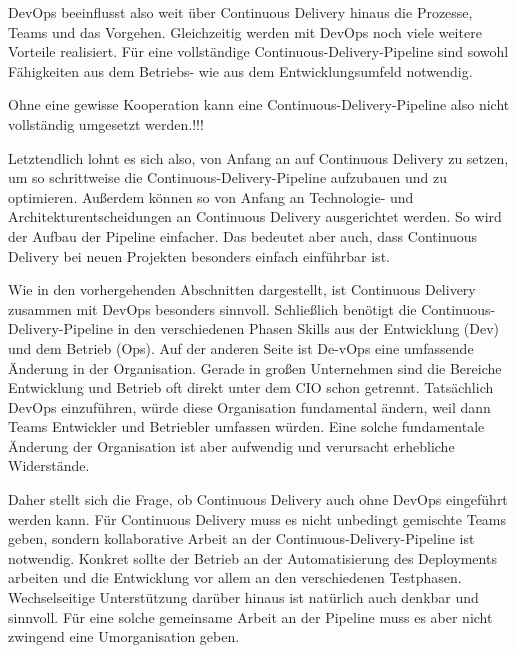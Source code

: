 DevOps beeinflusst also weit über Continuous Delivery hinaus die Prozesse, Teams und das Vorgehen. Gleichzeitig werden mit DevOps noch viele weitere Vorteile realisiert. Für eine vollständige Continuous-Delivery-Pipeline sind sowohl Fähigkeiten aus dem Betriebs- wie aus dem Entwicklungsumfeld notwendig. 


Ohne eine gewisse Kooperation kann eine Continuous-Delivery-Pipeline also nicht vollständig umgesetzt werden.!!!



Letztendlich lohnt es sich also, von Anfang an auf Continuous Delivery zu setzen, um so schrittweise die Continuous-Delivery-Pipeline aufzubauen und zu optimieren. Außerdem können so von Anfang an Technologie- und Architekturentscheidungen an Continuous Delivery ausgerichtet werden. So wird der Aufbau der Pipeline einfacher. Das bedeutet aber auch, dass Continuous Delivery bei neuen Projekten besonders einfach einführbar ist.


Wie in den vorhergehenden Abschnitten dargestellt, ist Continuous Delivery zusammen mit DevOps besonders sinnvoll. Schließlich benötigt die Continuous-Delivery-Pipeline in den verschiedenen Phasen Skills aus der Entwicklung (Dev) und dem Betrieb (Ops). Auf der anderen Seite ist De-vOps eine umfassende Änderung in der Organisation. Gerade in großen Unternehmen sind die Bereiche Entwicklung und Betrieb oft direkt unter dem CIO schon getrennt. Tatsächlich DevOps einzuführen, würde diese Organisation fundamental ändern, weil dann Teams Entwickler und Betriebler umfassen würden. Eine solche fundamentale Änderung der Organisation ist aber aufwendig und verursacht erhebliche Widerstände.

Daher stellt sich die Frage, ob Continuous Delivery auch ohne DevOps eingeführt werden kann. Für Continuous Delivery muss es nicht unbedingt gemischte Teams geben, sondern kollaborative Arbeit an der Continuous-Delivery-Pipeline ist notwendig. Konkret sollte der Betrieb an der Automatisierung des Deployments arbeiten und die Entwicklung vor allem an den verschiedenen Testphasen. Wechselseitige Unterstützung darüber hinaus ist natürlich auch denkbar und sinnvoll. Für eine solche gemeinsame Arbeit an der Pipeline muss es aber nicht zwingend eine Umorganisation geben.

